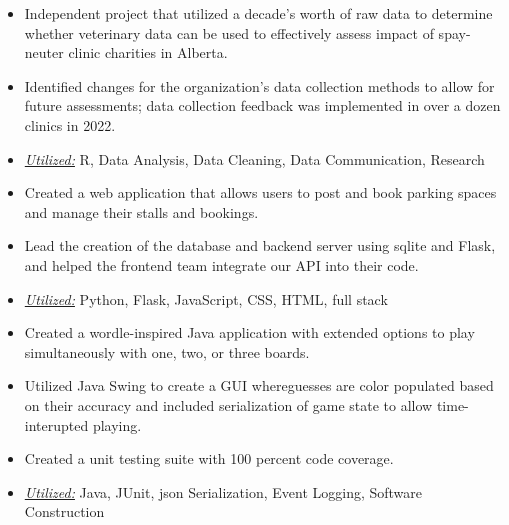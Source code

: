 \documentclass[10pt,a4paper,ragged2e]{altacv}
\begin{document}
\begin{itemize}
\item Independent project that utilized a decade's worth of raw data to determine whether veterinary data can be used to effectively assess impact of spay-neuter clinic charities in Alberta.
\item Identified changes for the organization's data collection methods to allow for future assessments; data collection feedback was implemented in over a dozen clinics in 2022.
\item \underline{\textit{Utilized:}} R, Data Analysis, Data Cleaning, Data Communication, Research
\end{itemize}

\begin{itemize}
  \item Created a web application that allows users to post and book parking spaces and manage their stalls and bookings.
  \item Lead the creation of the database and backend server using sqlite and Flask, and helped the frontend team integrate our API into their code.
  \item \underline{\textit{Utilized:}} Python, Flask, JavaScript, CSS, HTML, full stack 
\end{itemize}
\divider\small

\begin{itemize}
  \item Created a wordle-inspired Java application with extended options to play simultaneously with one, two, or three boards.
  \item Utilized Java Swing to create a GUI whereguesses are color populated based on their accuracy and included serialization of game state to allow time-interupted playing.
  \item Created a unit testing suite with 100 percent code coverage.
  \item \underline{\textit{Utilized:}} Java, JUnit, json Serialization, Event Logging, Software Construction
\end{itemize}
\divider\small
\end{document}
